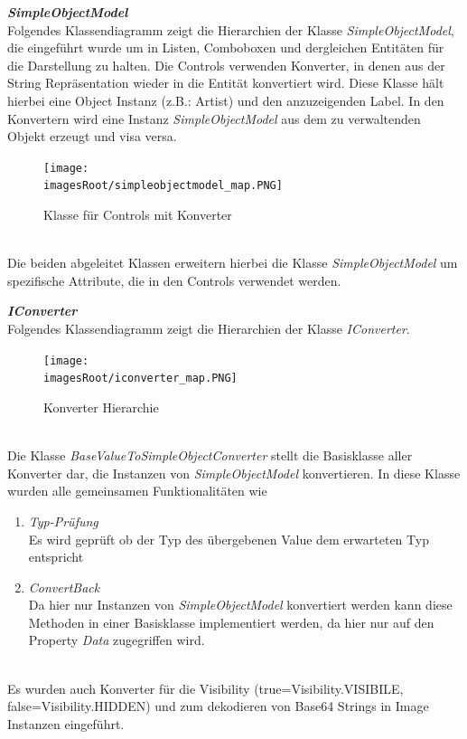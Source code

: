 \documentclass[11pt, a4paper, twoside]{article}   	%
\newcommand{\imagesRoot}{images}
\begin{document}
\newpage
\textbf{\emph{SimpleObjectModel}}\\
Folgendes Klassendiagramm zeigt die Hierarchien der Klasse \emph{SimpleObjectModel}, die eingeführt wurde um in Listen, Comboboxen und dergleichen Entitäten für die Darstellung zu halten. Die Controls verwenden Konverter, in denen aus der String Repräsentation wieder in die Entität konvertiert wird. Diese Klasse hält hierbei eine Object Instanz (z.B.: Artist) und den anzuzeigenden Label. In den Konvertern wird eine Instanz \emph{SimpleObjectModel} aus dem zu verwaltenden Objekt erzeugt und visa versa.
\begin{figure}[h]
	\centering
	\texttt{[image: \\imagesRoot/simpleobjectmodel\_map.PNG]}
	\caption
	{Klasse für Controls mit Konverter}
\end{figure}
\ \\
Die beiden abgeleitet Klassen erweitern hierbei die Klasse \emph{SimpleObjectModel} um spezifische Attribute, die in den Controls verwendet werden.

\newpage
\textbf{\emph{IConverter}}\\
Folgendes Klassendiagramm zeigt die Hierarchien der Klasse \emph{IConverter}.
\begin{figure}[h]
	\centering
	\texttt{[image: \\imagesRoot/iconverter\_map.PNG]}
	\caption
	{Konverter Hierarchie}
\end{figure}
\ \\
Die Klasse \emph{BaseValueToSimpleObjectConverter} stellt die Basisklasse aller Konverter dar, die Instanzen von \emph{SimpleObjectModel} konvertieren. In diese Klasse wurden alle gemeinsamen Funktionalitäten wie 
\begin{enumerate}
	\item\emph{Typ-Prüfung}\\
	Es wird geprüft ob der Typ des übergebenen Value dem erwarteten Typ entspricht
	\item\emph{ConvertBack}\\
	Da hier nur Instanzen von \emph{SimpleObjectModel} konvertiert werden kann diese Methoden in einer Basisklasse implementiert werden, da hier nur auf den Property \emph{Data} zugegriffen wird.
\end{enumerate}
\ \\
Es wurden auch Konverter für die Visibility (true=Visibility.VISIBILE, false=Visibility.HIDDEN) und zum dekodieren von Base64 Strings in Image Instanzen eingeführt.
\end{document}
